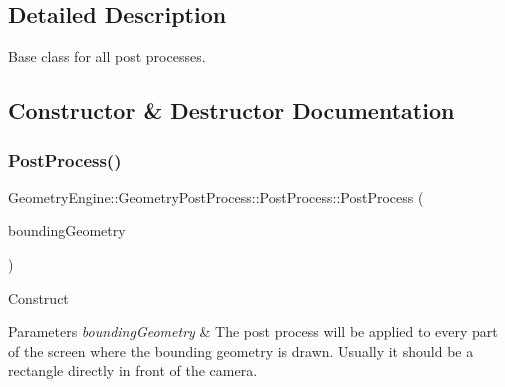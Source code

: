\subsection{Detailed Description}
Base class for all post processes. 

\subsection{Constructor \& Destructor Documentation}
\mbox{\label{class_geometry_engine_1_1_geometry_post_process_1_1_post_process_a3df1b89c25bd790e3ded93e088aca222}} 
\subsubsection{\texorpdfstring{PostProcess()}{PostProcess()}\hspace{0.1cm}{\footnotesize\ttfamily [1/2]}}
{\footnotesize\ttfamily Geometry\+Engine\+::\+Geometry\+Post\+Process\+::\+Post\+Process\+::\+Post\+Process (\begin{DoxyParamCaption}\item[{const \mbox{\hyperlink{class_geometry_engine_1_1_geometry_world_item_1_1_geometry_item_1_1_geometry_item}{Geometry\+World\+Item\+::\+Geometry\+Item\+::\+Geometry\+Item}} \&}]{bounding\+Geometry }\end{DoxyParamCaption})}

Construct 
\begin{DoxyParams}{Parameters}
{\em bounding\+Geometry} & The post process will be applied to every part of the screen where the bounding geometry is drawn. Usually it should be a rectangle directly in front of the camera. \\
\hline
\end{DoxyParams}
\mbox{\label{class_geometry_engine_1_1_geometry_post_process_1_1_post_process_af5599c4257746130644eb6beb421a25a}} 
